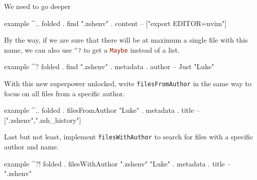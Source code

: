 \documentclass{exercise}
\newcommand\h[2][]{\lstinline[language=haskell,#1]{#2}}
\begin{document}
\begin{exercise}{We need to go deeper}
\begin{tasks}[resume*]
\begin{haskell}
example ^.. folded . find ".zshenv" . content
-- ["export EDITOR=nvim"]
				\end{haskell}
		\end{tasks}
		By the way, if we are sure that there will be at maximum a single file with this
		name, we can also use \h{^?} to get a \h{Maybe} instead of a list.
		\begin{haskell}
example ^? folded . find ".zshenv" . metadata . author
-- Just "Luke"
		\end{haskell}
		\begin{tasks}[resume*]
		\item With this new superpower unlocked, write \h{filesFromAuthor} in the same
			way to focus on all files from a specific author.
			\begin{haskell}
example ^.. folded . filesFromAuthor "Luke" . metadata . title
-- [".zshenv",".zsh_history"]
			\end{haskell}
		\item Last but not least, implement \h{filesWithAuthor} to search for files with
			a specific author and name.
			\begin{haskell}
example ^?! folded . filesWithAuthor ".zshenv" "Luke" . metadata . title
-- ".zshenv"
			\end{haskell}
		\end{tasks}
	\end{exercise}
\end{document}
